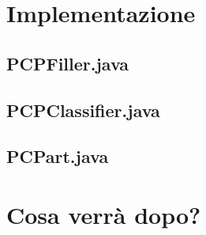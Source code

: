 \documentclass[12pt]{report}
\begin{document}
\newpage
\section{Implementazione}
\subsection{PCPFiller.java}
\subsection{PCPClassifier.java}
\subsection{PCPart.java}

\newpage
\section{Cosa verrà dopo?}

%
\end{document}
